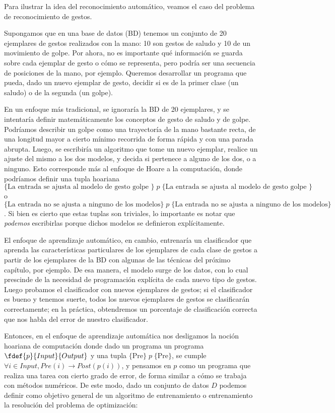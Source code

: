 
Para ilustrar la idea del reconocimiento automático, veamos el caso del problema de reconocimiento de gestos. 

Supongamos que en una base de datos (BD) tenemos un conjunto de 20 ejemplares de gestos realizados con la mano: 10 son gestos de saludo y 10 de un movimiento de golpe. Por ahora, no es importante qué información se guarda sobre cada ejemplar de gesto o cómo se representa, pero podría ser una secuencia de posiciones de la mano, por ejemplo. Queremos desarrollar un programa que pueda, dado un nuevo ejemplar de gesto, decidir si es de la primer clase (un saludo) o de la segunda (un golpe). 


\newcommand{\tuple}[3]{ \{ \text{#1}\} \; #2 \; \{ \text{#1}\}}

En un enfoque más tradicional, se ignoraría la BD de 20 ejemplares, y se intentaría definir matemáticamente los conceptos de gesto de saludo y de golpe. Podríamos describir un golpe como una trayectoría de la mano bastante recta, de una longitud mayor a cierto mínimo recorrida de forma rápida y con una parada abrupta. Luego, se escribiría un algoritmo que tome un nuevo ejemplar, realice un ajuste del mismo a los dos modelos, y decida si pertenece a alguno de los dos, o a ninguno. Esto corresponde más al enfoque de Hoare a la computación, donde podríamos definir una tupla hoariana $ \tuple{La entrada se ajusta al modelo de gesto golpe }{p}{El gesto es de golpe} $ o $\tuple{La entrada no se ajusta a ninguno de los modelos}{p}{El gesto no es un golpe ni un saludo}$. Si bien es cierto que estas tuplas son triviales, lo importante es notar que \textit{podemos} escribirlas porque dichos modelos se definieron explícitamente. 

El enfoque de aprendizaje automático, en cambio, entrenaría un clasificador que aprenda las características particulares de los ejemplares de cada clase de gestos a partir de los ejemplares de la BD con algunas de las técnicas del próximo capítulo, por ejemplo. De esa manera, el modelo surge de  los datos, con lo cual prescinde de la necesidad de programación explícita de cada nuevo tipo de gestos. Luego probamos el clasificador con nuevos ejemplares de gestos; si el clasificador es bueno y tenemos suerte, todos los nuevos ejemplares de gestos se clasificarán correctamente; en la práctica, obtendremos un porcentaje de clasificación correcta que nos habla del error de nuestro clasificador.

Entonces, en el enfoque de aprendizaje automática nos desligamos la noción hoariana de computación donde dado un programa un programa $\fdef{p}{Input}{Output}$ y una tupla $\tuple{Pre}{p}{Post}$, se cumple $\forall i \in Input, Pre(i) \rightarrow Post(p(i))$, y pensamos en $p$ como un programa que realiza una tarea con cierto grado de error, de forma similar a cómo se trabaja con métodos numéricos. De este modo, dado un conjunto de datos $D$ podemos definir como objetivo general de un algoritmo de entrenamiento o entrenamiento la resolución del problema de optimización:

